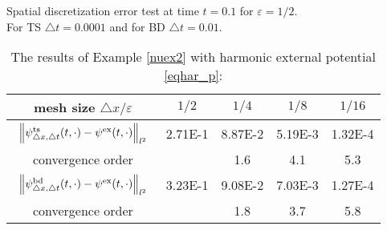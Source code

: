 \documentclass[leqno,final]{siamltex}
\numberwithin{equation}{section}
\newcounter{me}
\begin{document}
\begin{table}[htbp]
\caption{The results of Example \ref{nuex2} with harmonic external
potential \eqref{eqhar_p}:}\label{tb2_1}
\begin{center}\footnotesize

{Spatial discretization error test at time $t=0.1$ for ${{\varepsilon }}=1/2$.\\
For TS ${\triangle} t=0.0001$ and for BD ${\triangle} t=0.01$. }
\begin{tabular}{c|cccc}\hline
mesh size ${\triangle} x/{{\varepsilon }}$& $1/2$ & $1/4$ & $1/8$ &   $1/16$ \\ \hline
$\begin{array}{c}\vspace*{-4mm} \\
\left\|\psi^{\rm ts}_{{\triangle} x,{\triangle} t}(t,\cdot)-\psi^{\rm
ex}(t,\cdot)\right\|_{l^2}\\ \vspace*{-4mm} \end{array}$
 &  2.71E-1 & 8.87E-2 &  5.19E-3 & 1.32E-4 \\ \hline
convergence order & & 1.6 & 4.1& 5.3 \\ \hline \hline
$\begin{array}{c}\vspace*{-4mm} \\
\left\|\psi^{\rm bd}_{{\triangle} x,{\triangle} t}(t,\cdot)-\psi^{\rm
ex}(t,\cdot)\right\|_{l^2}\\ \vspace*{-4mm} \end{array}$
 &  3.23E-1& 9.08E-2 &  7.03E-3 & 1.27E-4 \\ \hline
convergence order & & 1.8 & 3.7& 5.8  \\ \hline 
\end{tabular}\vspace{5mm}


\end{center}
\end{table}
\end{document}

